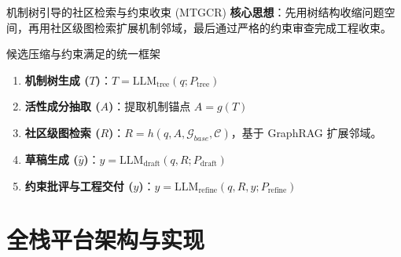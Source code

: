 \documentclass[aspectratio=169, 11pt, xcolor=table]{ctexbeamer}
\begin{document}
\begin{frame}{机制树引导的社区检索与约束收束 (MTGCR)}
    \textbf{核心思想}：先用树结构收缩问题空间，再用社区级图检索扩展机制邻域，最后通过严格的约束审查完成工程收束。
    
    \vspace{0.3cm}
    \begin{block}{候选压缩与约束满足的统一框架}
        \small
        \begin{enumerate}[<+->]
            \item \textbf{机制树生成 ($T$)}：$T = \mathrm{LLM}_{\mathrm{tree}}(q; P_{\mathrm{tree}})$
            \item \textbf{活性成分抽取 ($A$)}：提取机制锚点 $A = g(T)$
            \item \textbf{社区级图检索 ($R$)}：$R = h(q, A, \mathcal{G}_{base}, \mathcal{C})$，基于 GraphRAG 扩展邻域。
            \item \textbf{草稿生成 ($\hat{y}$)}：$\hat{y} = \mathrm{LLM}_{\mathrm{draft}}(q, R; P_{\mathrm{draft}})$
            \item \textbf{约束批评与工程交付 ($y$)}：$y = \mathrm{LLM}_{\mathrm{refine}}(q, R, \hat{y}; P_{\mathrm{refine}})$
        \end{enumerate}
    \end{block}
\end{frame}

\section{全栈平台架构与实现}
\end{document}
